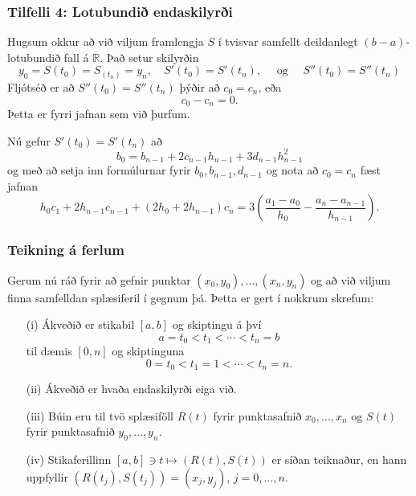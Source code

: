 \documentclass[icelandic,a4paper,12pt]{article}
\newcommand{\R}{{\mathbb  R}}
\begin{document}
\subsubsection{Tilfelli 4:  Lotubundið endaskilyrði} 
Hugsum okkur að við viljum framlengja $S$ í tvisvar samfellt
deildanlegt $(b-a)$-lotubundið fall á $\R$. Það setur skilyrðin 
\begin{equation*}
	y_0 = S(t_0) = S_(t_n) = y_n, \quad
	S'(t_0) = S'(t_n), \quad
	\text{ og } \quad
	S''(t_0) = S''(t_n)
\end{equation*}
Fljótséð er að $S''(t_0) = S''(t_n)$ þýðir að $c_0 = c_n$, eða
\begin{equation*}
	c_0 - c_n = 0.
\end{equation*}
Þetta er fyrri jafnan sem við þurfum.


Nú gefur $S'(t_0) = S'(t_n)$ að
\begin{equation*}
	b_0 = b_{n-1} + 2c_{n-1}h_{n-1} + 3d_{n-1}h_{n-1}^2
\end{equation*}
og með að setja inn formúlurnar fyrir $b_0, b_{n-1}, d_{n-1}$ og nota
að $c_0 = c_n$ fæst jafnan 
\begin{equation*}
	h_0c_1 + 2h_{n-1}c_{n-1} + (2h_0 + 2h_{n-1})c_n
	= 3 \left( \frac{a_1-a_0}{h_0} 
		- \frac{a_n-a_{n-1}}{h_{n-1}} \right).
\end{equation*}


\subsubsection{Teikning á ferlum} 
Gerum nú ráð fyrir að gefnir punktar $(x_0,y_0),\dots,(x_n,y_n)$ 
og að við viljum finna samfelldan splæsiferil í gegnum þá. 
Þetta er gert í nokkrum skrefum:

\pause
\begin{enumerate}
\item[(i)] Ákveðið er  stikabil $[a,b]$ og skiptingu á því 
$$
a=t_0<t_1<\cdots<t_n=b
$$
til dæmis $[0,n]$ og skiptinguna
$$
0=t_0<t_1=1<\cdots<t_n=n.
$$
\pause
\item[(ii)] Ákveðið er hvaða endaskilyrði eiga við.
\pause
\item[(iii)] Búin eru til tvö splæsiföll $R(t)$ fyrir punktasafnið 
$x_0,\dots,x_n$ og $S(t)$ fyrir punktasafnið $y_0,\dots,y_n$. 
\pause
\item[(iv)] Stikaferillinn 
$
[a,b]\ni t\mapsto (R(t),S(t)) 
$
er síðan teiknaður, en hann uppfyllir $(R(t_j),S(t_j))=(x_j,y_j)$,
$j=0,\dots,n$. 
\end{enumerate}
\end{document}
